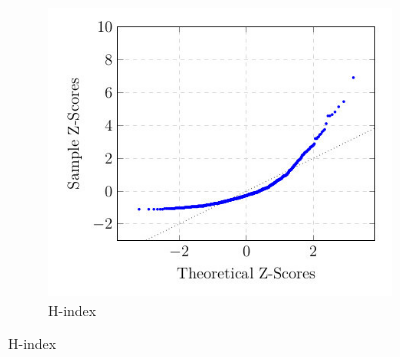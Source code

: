 \documentclass[man,floatsintext]{apa6}
\begin{document}
\begin{figure}[h]
\centering
\begin{subfigure}[b]{0.4\textwidth}
    \centerline{\includegraphics[scale=0.45]{normal_plot_hindex}}

    \caption{H-index}
    \label{fig:hindex_normality}
  

\end{subfigure}
\end{figure}
\end{document}
